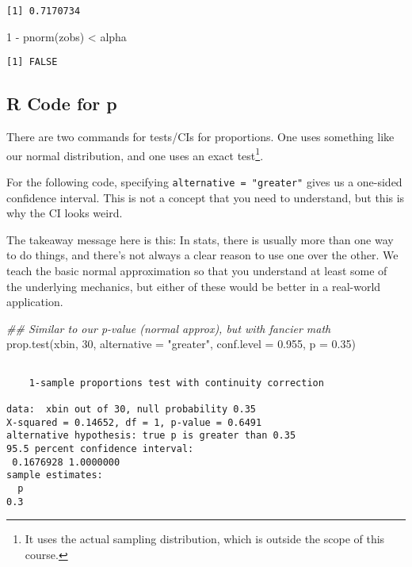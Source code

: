 \documentclass[
  letterpaper,
  DIV=11,
  numbers=noendperiod]{scrreprt}
\newenvironment{Shaded}{\begin{snugshade}}{\end{snugshade}}
\newcommand{\AttributeTok}[1]{\textcolor[rgb]{0.40,0.45,0.13}{#1}}
\newcommand{\DecValTok}[1]{\textcolor[rgb]{0.68,0.00,0.00}{#1}}
\newcommand{\DocumentationTok}[1]{\textcolor[rgb]{0.37,0.37,0.37}{\textit{#1}}}
\newcommand{\FloatTok}[1]{\textcolor[rgb]{0.68,0.00,0.00}{#1}}
\newcommand{\FunctionTok}[1]{\textcolor[rgb]{0.28,0.35,0.67}{#1}}
\newcommand{\NormalTok}[1]{\textcolor[rgb]{0.00,0.23,0.31}{#1}}
\newcommand{\SpecialCharTok}[1]{\textcolor[rgb]{0.37,0.37,0.37}{#1}}
\newcommand{\StringTok}[1]{\textcolor[rgb]{0.13,0.47,0.30}{#1}}
\begin{document}
\begin{verbatim}
[1] 0.7170734
\end{verbatim}

\begin{Shaded}
\begin{Highlighting}[]
\DecValTok{1} \SpecialCharTok{{-}} \FunctionTok{pnorm}\NormalTok{(zobs) }\SpecialCharTok{\textless{}}\NormalTok{ alpha}
\end{Highlighting}
\end{Shaded}

\begin{verbatim}
[1] FALSE
\end{verbatim}

\hypertarget{r-code-for-p}{%
\subsection{R Code for p}\label{r-code-for-p}}

There are two commands for tests/CIs for proportions. One uses something
like our normal distribution, and one uses an exact test\footnote{It
  uses the actual sampling distribution, which is outside the scope of
  this course.}.

For the following code, specifying \texttt{alternative\ =\ "greater"}
gives us a one-sided confidence interval. This is not a concept that you
need to understand, but this is why the CI looks weird.

The takeaway message here is this: In stats, there is usually more than
one way to do things, and there's not always a clear reason to use one
over the other. We teach the basic normal approximation so that you
understand at least some of the underlying mechanics, but either of
these would be better in a real-world application.

\begin{Shaded}
\begin{Highlighting}[]
\DocumentationTok{\#\# Similar to our p{-}value (normal approx), but with fancier math}
\FunctionTok{prop.test}\NormalTok{(xbin, }\DecValTok{30}\NormalTok{, }\AttributeTok{alternative =} \StringTok{"greater"}\NormalTok{, }\AttributeTok{conf.level =} \FloatTok{0.955}\NormalTok{, }\AttributeTok{p =} \FloatTok{0.35}\NormalTok{)}
\end{Highlighting}
\end{Shaded}

\begin{verbatim}

    1-sample proportions test with continuity correction

data:  xbin out of 30, null probability 0.35
X-squared = 0.14652, df = 1, p-value = 0.6491
alternative hypothesis: true p is greater than 0.35
95.5 percent confidence interval:
 0.1676928 1.0000000
sample estimates:
  p 
0.3 
\end{verbatim}
\end{document}
